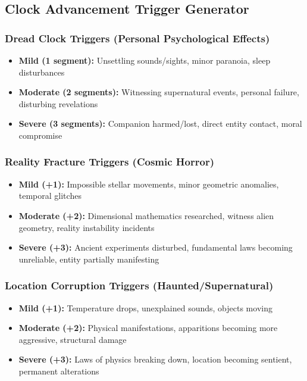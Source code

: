 \documentclass[11pt]{article}
\begin{document}
\subsection{Clock Advancement Trigger Generator}

\subsubsection{Dread Clock Triggers (Personal Psychological Effects)}
\begin{itemize}
\item \textbf{Mild (1 segment):} Unsettling sounds/sights, minor paranoia, sleep disturbances
\item \textbf{Moderate (2 segments):} Witnessing supernatural events, personal failure, disturbing revelations
\item \textbf{Severe (3 segments):} Companion harmed/lost, direct entity contact, moral compromise
\end{itemize}

\subsubsection{Reality Fracture Triggers (Cosmic Horror)}
\begin{itemize}
\item \textbf{Mild (+1):} Impossible stellar movements, minor geometric anomalies, temporal glitches
\item \textbf{Moderate (+2):} Dimensional mathematics researched, witness alien geometry, reality instability incidents
\item \textbf{Severe (+3):} Ancient experiments disturbed, fundamental laws becoming unreliable, entity partially manifesting
\end{itemize}

\subsubsection{Location Corruption Triggers (Haunted/Supernatural)}
\begin{itemize}
\item \textbf{Mild (+1):} Temperature drops, unexplained sounds, objects moving
\item \textbf{Moderate (+2):} Physical manifestations, apparitions becoming more aggressive, structural damage
\item \textbf{Severe (+3):} Laws of physics breaking down, location becoming sentient, permanent alterations
\end{itemize}
\end{document}

